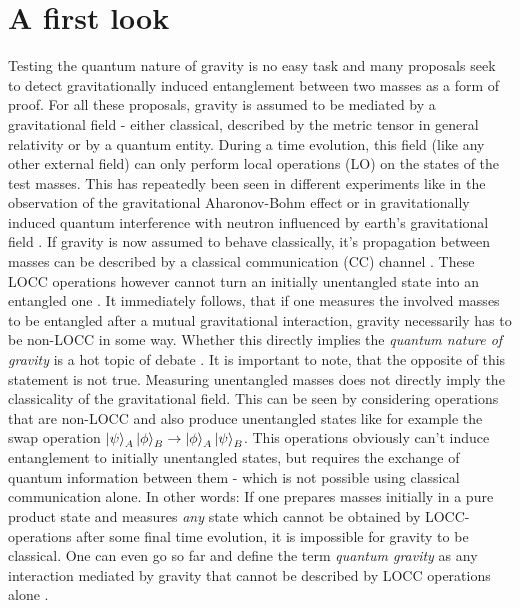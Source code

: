\chapter{A first look}\label{cha:first-look}

Testing the quantum nature of gravity is no easy task and many proposals seek to detect gravitationally induced entanglement between two masses \cite{Krisnanda_2020,Chevalier_2020,Pedernales_2019,Bose_2017} as a form of proof. 
For all these proposals, gravity is assumed to be mediated by a gravitational field - either classical, described by the metric tensor in general relativity or by a quantum entity.
During a time evolution, this field (like any other external field) can only perform local operations (LO) on the states of the test masses.
This has repeatedly been seen in different experiments like in the observation of the gravitational Aharonov-Bohm effect \cite{Overstreet_2022} or in gravitationally induced quantum interference with neutron influenced by earth's gravitational field \cite{Colella_1975}.
If gravity is now assumed to behave classically, it's propagation between masses can be described by a classical communication (CC) channel \cite{Lami_2024}.
These LOCC operations however cannot turn an initially unentangled state into an entangled one \cite{Horodecki_2009, Plenio_2005a}.
It immediately follows, that if one measures the involved masses to be entangled after a mutual gravitational interaction, gravity necessarily has to be non-LOCC in some way.
Whether this directly implies the \textit{quantum nature of gravity} is a hot topic of debate \cite{Hall_2018}.
It is important to note, that the opposite of this statement is not true. Measuring unentangled masses does not directly imply the classicality of the gravitational field.
This can be seen by considering operations that are non-LOCC and also produce unentangled states like for example the swap operation $\ket{\psi}_A\ket{\phi}_B \rightarrow \ket{\phi}_A\ket{\psi}_B$. This operations obviously can't induce entanglement to initially unentangled states, but requires the exchange of quantum information between them - which is not possible using classical communication alone.
In other words: If one prepares masses initially in a pure product state and measures \textit{any} state which cannot be obtained by LOCC-operations after some final time evolution, it is impossible for gravity to be classical. One can even go so far and define the term \emph{quantum gravity} as any interaction mediated by gravity that cannot be described by LOCC operations alone \cite{Lami_2024}.

